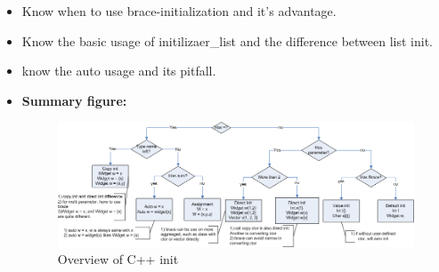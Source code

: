 \documentclass[a4paper,11pt,twoside]{book}
\begin{document}
\begin{itemize}
	\item Know when to use brace-initialization and it's advantage.
	
	\item Know the basic usage of initilizaer\_list and the difference between list init.
	
	\item know the auto usage and its pitfall.
 
	\item \textbf{Summary figure:}
	\begin{figure}[h]
		\centering
		\includegraphics[width=0.95\linewidth]{pics/init.png}
		\caption{Overview of C++ init}
		\label{fig:command}
	\end{figure}
	
\end{itemize}
\end{document}
